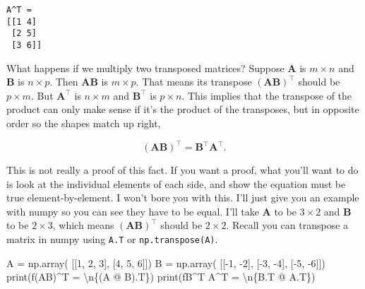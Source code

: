 \documentclass[
  letterpaper,
  DIV=11,
  numbers=noendperiod]{scrreprt}
\newenvironment{Shaded}{\begin{snugshade}}{\end{snugshade}}
\newcommand{\BuiltInTok}[1]{\textcolor[rgb]{0.00,0.23,0.31}{#1}}
\newcommand{\CharTok}[1]{\textcolor[rgb]{0.13,0.47,0.30}{#1}}
\newcommand{\DecValTok}[1]{\textcolor[rgb]{0.68,0.00,0.00}{#1}}
\newcommand{\NormalTok}[1]{\textcolor[rgb]{0.00,0.23,0.31}{#1}}
\newcommand{\OperatorTok}[1]{\textcolor[rgb]{0.37,0.37,0.37}{#1}}
\newcommand{\SpecialCharTok}[1]{\textcolor[rgb]{0.37,0.37,0.37}{#1}}
\newcommand{\SpecialStringTok}[1]{\textcolor[rgb]{0.13,0.47,0.30}{#1}}
\begin{document}
\begin{verbatim}
A^T = 
[[1 4]
 [2 5]
 [3 6]]
\end{verbatim}

What happens if we multiply two transposed matrices? Suppose
\(\mathbf{A}\) is \(m \times n\) and \(\mathbf{B}\) is \(n \times p\).
Then \(\mathbf{A}\mathbf{B}\) is \(m \times p\). That means its
transpose \((\mathbf{A}\mathbf{B})^\top\) should be \(p \times m\). But
\(\mathbf{A}^\top\) is \(n \times m\) and \(\mathbf{B}^\top\) is
\(p \times n\). This implies that the transpose of the product can only
make sense if it's the product of the transposes, but in opposite order
so the shapes match up right,

\[(\mathbf{A}\mathbf{B})^\top = \mathbf{B}^\top \mathbf{A}^\top.\]

This is not really a proof of this fact. If you want a proof, what
you'll want to do is look at the individual elements of each side, and
show the equation must be true element-by-element. I won't bore you with
this. I'll just give you an example with numpy so you can see they have
to be equal. I'll take \(\mathbf{A}\) to be \(3 \times 2\) and
\(\mathbf{B}\) to be \(2 \times 3\), which means
\((\mathbf{A}\mathbf{B})^\top\) should be \(2 \times 2\). Recall you can
transpose a matrix in numpy using \texttt{A.T} or
\texttt{np.transpose(A)}.

\begin{Shaded}
\begin{Highlighting}[]
\NormalTok{A }\OperatorTok{=}\NormalTok{ np.array(}
\NormalTok{    [[}\DecValTok{1}\NormalTok{, }\DecValTok{2}\NormalTok{, }\DecValTok{3}\NormalTok{], }
\NormalTok{     [}\DecValTok{4}\NormalTok{, }\DecValTok{5}\NormalTok{, }\DecValTok{6}\NormalTok{]])}
\NormalTok{B }\OperatorTok{=}\NormalTok{ np.array(}
\NormalTok{    [[}\OperatorTok{{-}}\DecValTok{1}\NormalTok{, }\OperatorTok{{-}}\DecValTok{2}\NormalTok{], }
\NormalTok{     [}\OperatorTok{{-}}\DecValTok{3}\NormalTok{, }\OperatorTok{{-}}\DecValTok{4}\NormalTok{], }
\NormalTok{     [}\OperatorTok{{-}}\DecValTok{5}\NormalTok{, }\OperatorTok{{-}}\DecValTok{6}\NormalTok{]])}
\BuiltInTok{print}\NormalTok{(}\SpecialStringTok{f\textquotesingle{}(AB)\^{}T = }\CharTok{\textbackslash{}n}\SpecialCharTok{\{}\NormalTok{(A }\OperatorTok{@}\NormalTok{ B)}\SpecialCharTok{.}\NormalTok{T}\SpecialCharTok{\}}\SpecialStringTok{\textquotesingle{}}\NormalTok{)}
\BuiltInTok{print}\NormalTok{(}\SpecialStringTok{f\textquotesingle{}B\^{}T A\^{}T = }\CharTok{\textbackslash{}n}\SpecialCharTok{\{}\NormalTok{B}\SpecialCharTok{.}\NormalTok{T }\OperatorTok{@}\NormalTok{ A}\SpecialCharTok{.}\NormalTok{T}\SpecialCharTok{\}}\SpecialStringTok{\textquotesingle{}}\NormalTok{)}
\end{Highlighting}
\end{Shaded}
\end{document}
